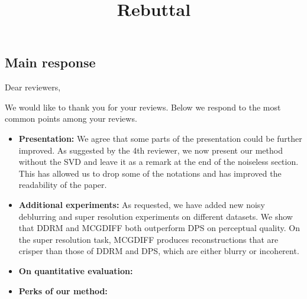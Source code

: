 \documentclass{article}
\title{Rebuttal}
\begin{document}
\maketitle

\subsection*{Main response}
Dear reviewers, 

We would like to thank you for your reviews. Below we respond to the most common points among your reviews. 
\begin{itemize} 
  \item \textbf{Presentation:} We agree that some parts of the presentation could be further improved. As suggested by the 4th reviewer, we now present our method without the SVD and leave it as a remark at the end of the noiseless section. This has allowed us to drop some of the notations and has improved the readability of the paper. 
  \item \textbf{Additional experiments:} As requested, we have added new noisy deblurring and super resolution experiments on different datasets. We show that DDRM and MCGDIFF both outperform DPS on perceptual quality. On the super resolution task, MCGDIFF produces reconstructions that are crisper than those of DDRM and DPS, which are either blurry or incoherent. 
  \item \textbf{On quantitative evaluation:}
  \item \textbf{Perks of our method:}
\end{itemize}
\end{document}

